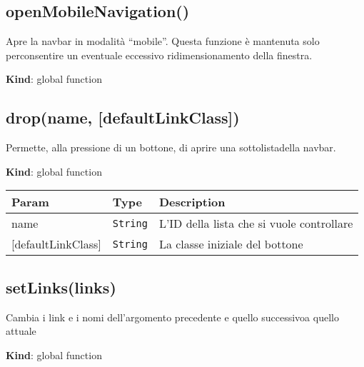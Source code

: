\protect\hypertarget{openMobileNavigation}{}{}

\hypertarget{openmobilenavigation}{%
\subsection{openMobileNavigation()}\label{openmobilenavigation}}

Apre la navbar in modalità ``mobile''. Questa funzione è mantenuta solo
perconsentire un eventuale eccessivo ridimensionamento della finestra.

\textbf{Kind}: global function\\
\protect\hypertarget{drop}{}{}

\hypertarget{dropname-defaultlinkclass}{%
\subsection{drop(name,
{[}defaultLinkClass{]})}\label{dropname-defaultlinkclass}}

Permette, alla pressione di un bottone, di aprire una sottolistadella
navbar.

\textbf{Kind}: global function

\begin{tabularx}{\textwidth}{XXX}
\toprule
Param & Type & Description\tabularnewline
\midrule
\endhead
name & \texttt{String} & L'ID della lista che si vuole
controllare\tabularnewline
{[}defaultLinkClass{]} & \texttt{String} & La classe iniziale del
bottone\tabularnewline
\bottomrule
\end{tabularx}

\protect\hypertarget{setLinks}{}{}

\hypertarget{setlinkslinks}{%
\subsection{setLinks(links)}\label{setlinkslinks}}

Cambia i link e i nomi dell'argomento precedente e quello successivoa
quello attuale

\textbf{Kind}: global function

